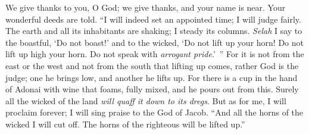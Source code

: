\begin{biblechapter} %
 We give thanks to you, O God; 
we give thanks, and your name is near. 
Your wonderful deeds are told.
\verse “I will indeed set an appointed time; 
I will judge fairly.
\verse The earth and all its inhabitants are shaking; 
I steady its columns. \textit{Selah}
\verse I say to the boastful, ‘Do not boast!’ 
and to the wicked, ‘Do not lift up your horn!
\verse Do not lift up high your horn. 
Do not speak with \textit{arrogant pride}.’ ”
\verse For it is not from the east or the west 
and not from the south that lifting up comes,
\verse rather God is the judge; 
one he brings low, and another he lifts up.
\verse For there is a cup in the hand of Adonai 
with wine that foams, fully mixed, 
and he pours out from this. 
Surely all the wicked of the land 
\textit{will quaff it down to its dregs}. 
\verse But as for me, I will proclaim forever; 
I will sing praise to the God of Jacob.
\verse “And all the horns of the wicked I will cut off. 
The horns of the righteous will be lifted up.”
\end{biblechapter}

